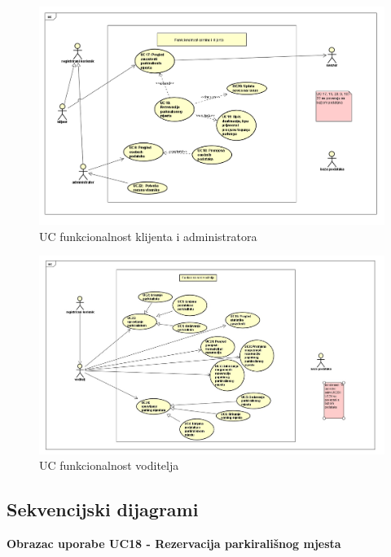 \begin{packed_item}
                    \begin{figure}[H]
						\includegraphics[width=\textwidth]{slike/klijent.PNG} %
						\caption{UC funkcionalnost klijenta i administratora}
						\label{fig:klijent}
					\end{figure}
				
				   \begin{figure}[H]
				   	\includegraphics[width=\textwidth]{slike/Voditelj.jpeg} %
				   	\caption{UC funkcionalnost voditelja}
				   	\label{fig:voditelj}
				   \end{figure}
				\eject		

				
			\subsection{Sekvencijski dijagrami}
				
				\textbf{Obrazac uporabe UC18 - Rezervacija parkirališnog mjesta}\\
				

\end{packed_item}
